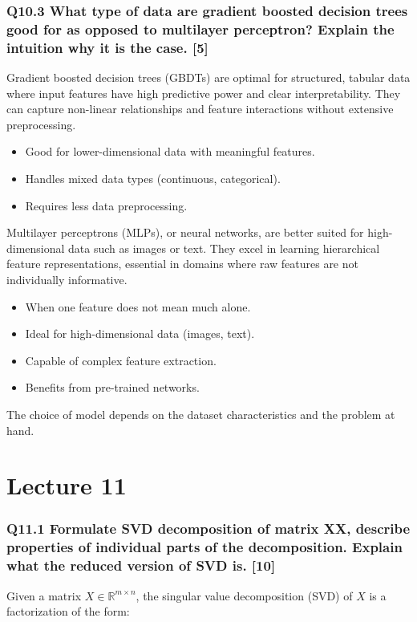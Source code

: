 \documentclass[11pt]{article}
\begin{document}
\section{Q10.3 What type of data are gradient boosted decision trees good for as opposed to multilayer perceptron? Explain the intuition why it is the case. [5]}


Gradient boosted decision trees (GBDTs) are optimal for structured, tabular data where input features have high predictive power and clear interpretability. They can capture non-linear relationships and feature interactions without extensive preprocessing.

\begin{itemize}
    \item Good for lower-dimensional data with meaningful features.
    \item Handles mixed data types (continuous, categorical).
    \item Requires less data preprocessing.
\end{itemize}

Multilayer perceptrons (MLPs), or neural networks, are better suited for high-dimensional data such as images or text. They excel in learning hierarchical feature representations, essential in domains where raw features are not individually informative.

\begin{itemize}
    \item When one feature does not mean much alone.
    \item Ideal for high-dimensional data (images, text).
    \item Capable of complex feature extraction.
    \item Benefits from pre-trained networks.
\end{itemize}

The choice of model depends on the dataset characteristics and the problem at hand.

\part{Lecture 11}
\section{Q11.1 Formulate SVD decomposition of matrix XX, describe properties of individual parts of the decomposition. Explain what the reduced version of SVD is. [10]}

Given a matrix \( X \in \mathbb{R}^{m \times n} \), the singular value decomposition (SVD) of \( X \) is a factorization of the form:
\end{document}
